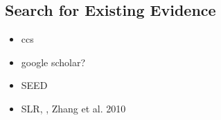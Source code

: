 \subsection{Search for Existing Evidence}

\begin{itemize}
	\item ccs
	\item google scholar?
	\item SEED
	\item SLR, , Zhang et al. 2010
\end{itemize}